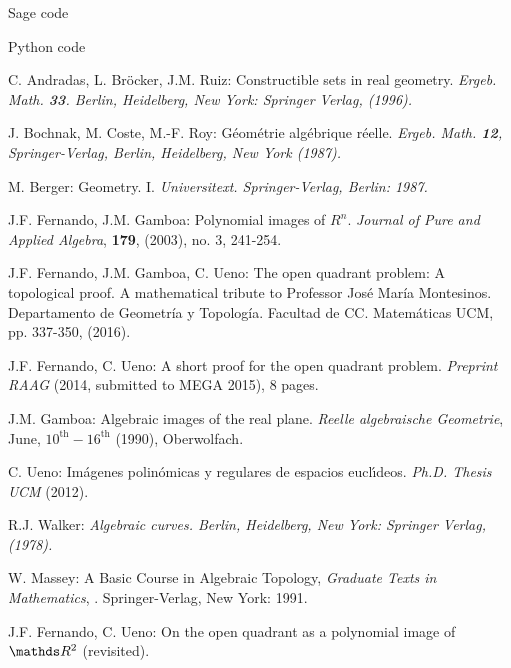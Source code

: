 \documentclass[11pt, a4paper, english, twoside, notitlepage, openright]{report}
\begin{document}
\begin{chapter}{Sage code}

\end{chapter}

\begin{chapter}{Python code}

\end{chapter}

\begin{thebibliography}{ABR}

 C. Andradas, L. Br\"ocker, J.M. Ruiz: Constructible 
sets in real geometry. \em Ergeb. Math. \em{\bf 33}. Berlin, Heidelberg, 
New York: Springer Verlag, (1996).

 J. Bochnak, M. Coste, M.-F. Roy: G\'eom\'etrie
alg\'ebrique r\'eelle. \em Ergeb. Math. \em {\bf 12}, Springer-Verlag,
Berlin, Heidelberg, New York (1987).

 M. Berger: Geometry. I. \em Universitext\em. Springer-Verlag, Berlin: 1987.

 J.F. Fernando, J.M. Gamboa: Polynomial images of $R^n$.
\textit{Journal of Pure and Applied Algebra}, {\bf 179}, (2003), no. 3, 241-254.

 J.F. Fernando, J.M. Gamboa, C. Ueno: The open quadrant problem:
A topological proof.  A mathematical tribute to Professor Jos\'e Mar\'ia Montesinos. Departamento de Geometr\'ia y Topolog\'ia. Facultad de CC. Matem\'aticas UCM, pp. 337-350, (2016).

 J.F. Fernando, C. Ueno: A short proof for the open quadrant problem.
\textit{Preprint RAAG} (2014, submitted to MEGA 2015), 8 pages.

 J.M. Gamboa: Algebraic images of the real plane. \textit{Reelle algebraische Geometrie}, June,
$10^{\text{th}}-16^{\text{th}}$ (1990), Oberwolfach.

 C. Ueno: Im\'agenes polin\'omicas y regulares de espacios eucl\'\i deos. {\em Ph.D. Thesis UCM} (2012).

 R.J. Walker: \em Algebraic curves. \em Berlin, Heidelberg, 
New York: Springer Verlag, (1978).

 W. Massey: A Basic Course in Algebraic Topology, \emph{Graduate Texts in Mathematics}, \textbf{}.
Springer-Verlag, New York: 1991.

 J.F. Fernando, C. Ueno: On the open quadrant as a polynomial image of $\R^2$ (revisited).



\end{thebibliography}
\end{document}
